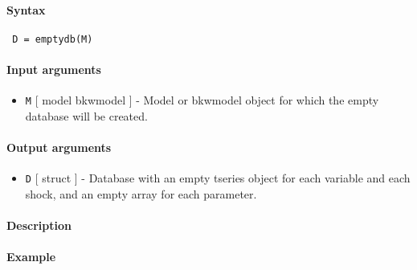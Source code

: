 


	\paragraph{Syntax}
 
 \begin{verbatim}
 D = emptydb(M)
 \end{verbatim}
 
 \paragraph{Input arguments}
 
 \begin{itemize}
 \item
   \texttt{M} {[} model \textbar{} bkwmodel {]} - Model or bkwmodel
   object for which the empty database will be created.
 \end{itemize}
 
 \paragraph{Output arguments}
 
 \begin{itemize}
 \item
   \texttt{D} {[} struct {]} - Database with an empty tseries object for
   each variable and each shock, and an empty array for each parameter.
 \end{itemize}
 
 \paragraph{Description}
 
 \paragraph{Example}


